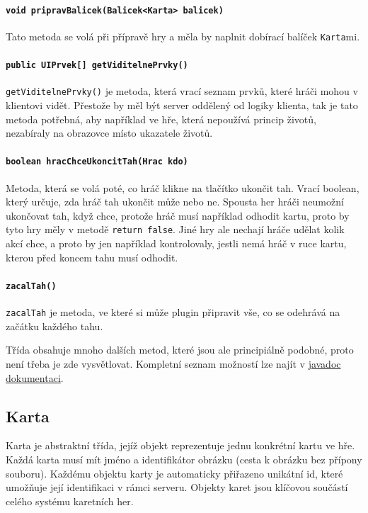 \paragraph{\texttt{void pripravBalicek(Balicek<Karta> balicek)}}
Tato metoda se volá při přípravě hry a měla by naplnit dobírací balíček \texttt{Karta}mi.
\paragraph{\texttt{public UIPrvek[] getViditelnePrvky()}}
\texttt{getViditelnePrvky()} je metoda, která vrací seznam prvků, které hráči mohou v klientovi vidět. Přestože by měl být server oddělený od logiky klienta, tak je tato metoda potřebná, aby například ve hře, která nepoužívá princip životů, nezabíraly na obrazovce místo ukazatele životů.
\paragraph{\texttt{boolean hracChceUkoncitTah(Hrac kdo)}}
Metoda, která se volá poté, co hráč klikne na tlačítko ukončit tah. Vrací boolean, který určuje, zda hráč tah ukončit může nebo ne. Spousta her hráči neumožní ukončovat tah, když chce, protože hráč musí například odhodit kartu, proto by tyto hry měly v metodě \texttt{return false}. Jiné hry ale nechají hráče udělat kolik akcí chce, a proto by jen například kontrolovaly, jestli nemá hráč v ruce kartu, kterou před koncem tahu musí odhodit.

\paragraph{\texttt{zacalTah()}}
\texttt{zacalTah} je metoda, ve které si může plugin připravit vše, co se odehrává na začátku každého tahu.

Třída obsahuje mnoho dalších metod, které jsou ale principiálně podobné, proto není třeba je zde vysvětlovat. Kompletní seznam možností lze najít v \href{https://bang.honzaa.cz/apidocs/cz/honzaa/bang/sdk/HerniPravidla.html}{javadoc dokumentaci}.

\subsection{Karta}
Karta je abstraktní třída, jejíž objekt reprezentuje jednu konkrétní kartu ve hře. Každá karta musí mít jméno a identifikátor obrázku (cesta k obrázku bez přípony souboru). Každému objektu karty je automaticky přiřazeno unikátní id, které umožňuje její identifikaci v rámci serveru. Objekty karet jsou klíčovou součástí celého systému karetních her.

